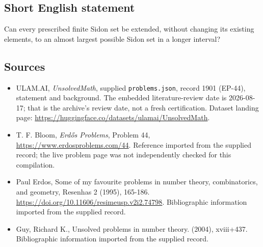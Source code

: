 \documentclass[11pt,a4paper]{article}
\begin{document}
\subsection{Short English statement}

Can every prescribed finite Sidon set be extended, without changing its existing elements, to an almost largest possible Sidon set in a longer interval?

\subsection{Sources}

{\small

\begin{itemize}

\item[\hypertarget{source:1901:1}{S1}] ULAM.AI, \emph{UnsolvedMath}, supplied \texttt{problems.json}, record 1901 (EP-44), statement and background. The embedded literature-review date is 2026-08-17; that is the archive’s review date, not a fresh certification. Dataset landing page: \url{https://huggingface.co/datasets/ulamai/UnsolvedMath}.

\item[\hypertarget{source:1901:2}{S2}] T. F. Bloom, \emph{Erdős Problems}, Problem 44, \url{https://www.erdosproblems.com/44}. Reference imported from the supplied record; the live problem page was not independently checked for this compilation.

\item[\hypertarget{source:1901:3}{S3}] Paul Erdos, Some of my favourite problems in number theory, combinatorics, and geometry, Resenhas 2 (1995), 165-186. \url{https://doi.org/10.11606/resimeusp.v2i2.74798}. Bibliographic information imported from the supplied record.

\item[\hypertarget{source:1901:4}{S4}] Guy, Richard K., Unsolved problems in number theory. (2004), xviii+437. Bibliographic information imported from the supplied record.

\end{itemize}

}

\label{end:1901}
\end{document}
